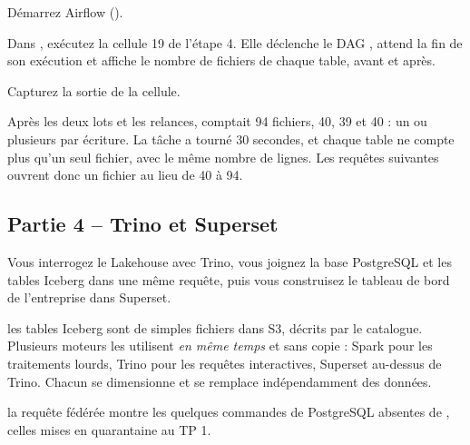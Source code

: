 \begin{obtenir}
  \item Démarrez Airflow ().
  \item Dans , exécutez la cellule 19 de l'étape 4. Elle déclenche le DAG , attend la fin de son exécution et affiche le nombre de fichiers de chaque table, avant et après.
  \item Capturez la sortie de la cellule.
\end{obtenir}
\begin{lecture}
Après les deux lots et les relances,  comptait 94 fichiers, 
40,  39 et  40 : un ou plusieurs par
écriture. La tâche  a tourné 30 secondes, et chaque table ne compte plus
qu'un seul fichier, avec le même nombre de lignes. Les requêtes suivantes ouvrent donc un fichier au
lieu de 40 à 94.
\end{lecture}


\subsection*{Partie 4 -- Trino et Superset \hfill {}}

Vous interrogez le Lakehouse avec Trino, vous joignez la base PostgreSQL et les tables Iceberg dans
une même requête, puis vous construisez le tableau de bord de l'entreprise dans Superset.

\begin{notion}
les tables Iceberg sont de simples fichiers dans S3,
décrits par le catalogue. Plusieurs moteurs les utilisent \emph{en même temps} et sans copie :
Spark pour les traitements lourds, Trino pour les requêtes interactives, Superset au-dessus de
Trino. Chacun se dimensionne et se remplace indépendamment des données.
\end{notion}

\begin{resultat}
la requête fédérée montre les quelques commandes de PostgreSQL absentes de ,
celles mises en quarantaine au TP 1.
\end{resultat}

